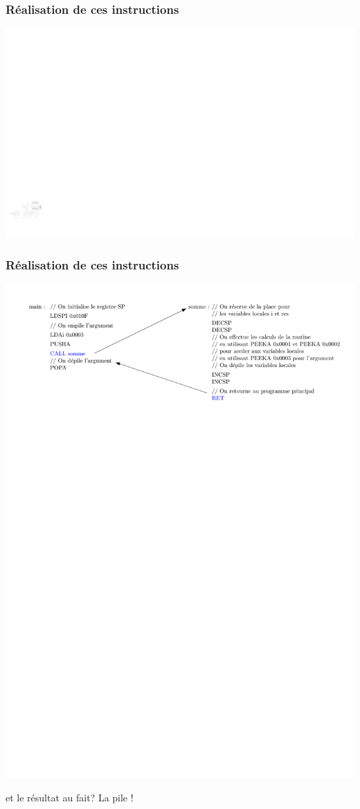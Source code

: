 \documentclass{beamer}
\begin{document}
\begin{frame}
\frametitle{Réalisation de ces instructions}
\includegraphics[width=\linewidth]{Figs/premier_chemin_seq_sp_tmp.pdf}
\end{frame}

\begin{frame}
\frametitle{Réalisation de ces instructions}
\includegraphics[width=\linewidth]{Figs/stack_args_ret.pdf}

et le résultat au fait? La pile !
\end{frame}
\end{document}
